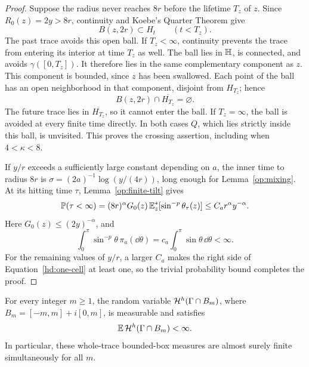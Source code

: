 \begin{proof}
Suppose the radius never reaches \(8r\) before the lifetime
\(T_z\) of \(z\). Since \(R_0(z)=2y>8r\), continuity and Koebe's
Quarter Theorem give
\[
 B(z,2r)\subset H_t\qquad(t<T_z).
\]
The past trace avoids this open ball. If \(T_z<\infty\),
continuity prevents the trace from entering its interior at
time \(T_z\) as well.
The ball lies in \(\mathbb H\), is connected, and avoids
\(\gamma([0,T_z])\). It therefore lies in the same complementary
component as \(z\). This component is bounded, since \(z\) has
been swallowed. Each point of the ball has an open neighborhood
in that component, disjoint from \(H_{T_z}\); hence
\[
 B(z,2r)\cap\overline{H_{T_z}}=\varnothing.
\]
The future trace lies in \(\overline{H_{T_z}}\), so it cannot
enter the ball. If \(T_z=\infty\), the ball is avoided at every
finite time directly. In both cases \(Q\), which lies strictly
inside this ball, is unvisited.
This proves the crossing assertion, including when
\(4<\kappa<8\).

If \(y/r\) exceeds a sufficiently large constant depending on
\(a\), the inner time to radius \(8r\) is
\(\sigma=(2a)^{-1}\log(y/(4r))\), long enough for
Lemma~\ref{op:mixing}. At its hitting time \(\tau\),
Lemma~\ref{op:finite-tilt} gives
\[
 \mathbb P(\tau<\infty)
 =(8r)^\alpha G_0(z)\,
     \mathbb E_z^*[\sin^{-p}\theta_\tau(z)]
 \le C_a r^\alpha y^{-\alpha}.
\]
Here \(G_0(z)\le(2y)^{-\alpha}\), and
\[
 \int_0^\pi\sin^{-p}\theta\,\pi_a(\dd\theta)
 =c_a\int_0^\pi\sin\theta\,\dd\theta<\infty.
\]
For the remaining values of \(y/r\), a larger \(C_a\) makes the
right side of Equation~\eqref{hd:one-cell} at least one, so the
trivial probability bound completes the proof.
\end{proof}

\begin{proposition}
\label{hd:upper}
For every integer $m\ge1$, the random variable
$\mathcal H^h(\Gamma\cap B_m)$, where $B_m=[-m,m]+i[0,m]$, is measurable
and satisfies
\begin{equation}
 \mathbb E\,\mathcal H^h(\Gamma\cap B_m)<\infty.
 \label{hd:expected-box}
\end{equation}
In particular, these whole-trace bounded-box measures are almost
surely finite simultaneously for all $m$.
\end{proposition}


